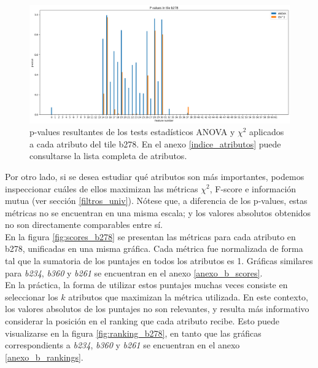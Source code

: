 \begin{figure}[h!]
\centering
  \includegraphics[width=1\textwidth]{Kap6/test=b278_variable_importance_pvalues}
\caption{ p-values resultantes de los tests estadísticos ANOVA y $\chi^2$ aplicados a cada atributo del tile b278. En el anexo \protect\ref{indice_atributos} puede consultarse la lista completa de atributos. }
\label{fig:pvalues_b278}
\end{figure}

Por otro lado, si se desea estudiar qué atributos son más importantes, podemos inspeccionar cuáles de ellos maximizan las métricas $\chi^2$, F-score e información mutua (ver sección \ref{filtros_univ}). Nótese que, a diferencia de los p-values, estas métricas no se encuentran en una misma escala; y los valores absolutos obtenidos no son directamente comparables entre sí. \\

En la figura \ref{fig:scores_b278} se presentan las métricas para cada atributo en b278, unificadas en una misma gráfica. Cada métrica fue normalizada de forma tal que la sumatoria de los puntajes en todos los atributos es 1. Gráficas similares para \textit{b234}, \textit{b360} y \textit{b261} se encuentran en el anexo \ref{anexo_b_scores}. \\

En la práctica, la forma de utilizar estos puntajes muchas veces consiste en seleccionar los $k$ atributos que maximizan la métrica utilizada. En este contexto, los valores absolutos de los puntajes no son relevantes, y resulta más informativo considerar la posición en el ranking que cada atributo recibe. Esto puede visualizarse en la figura \ref{fig:ranking_b278}, en tanto que las gráficas correspondients a \textit{b234}, \textit{b360} y \textit{b261} se encuentran en el anexo \ref{anexo_b_rankings}. 

